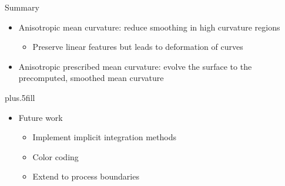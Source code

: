\documentclass{beamer}
\begin{document}
\begin{frame}{Summary}
  \begin{itemize}
  \item
    Anisotropic mean curvature: reduce smoothing in high curvature regions
    \begin{itemize}
    \item Preserve linear features but leads to deformation of curves
    \end{itemize}
  \item
    Anisotropic prescribed mean curvature: evolve the surface to the precomputed, smoothed mean curvature
  \end{itemize}
  \vskip0pt plus.5fill
  \begin{itemize}
  \item
    Future work
    \begin{itemize}
    \item Implement implicit integration methods
    \item Color coding
    \item Extend to process boundaries
    \end{itemize}
  \end{itemize}
\end{frame}


    
    

 
    

\end{document}
